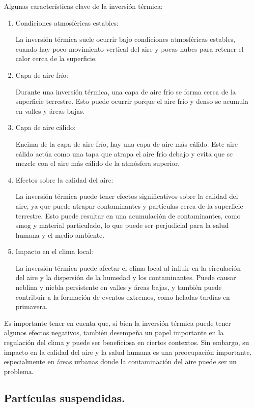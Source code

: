 \documentclass[12pt]{article}
\begin{document}
Algunas características clave de la inversión térmica:
\begin{enumerate}
\item Condiciones atmosféricas estables:

La inversión térmica suele ocurrir bajo condiciones atmosféricas estables, cuando hay poco movimiento vertical del aire y pocas nubes para retener el calor cerca de la superficie.
\item Capa de aire frío:

Durante una inversión térmica, una capa de aire frío se forma cerca de la superficie terrestre. Esto puede ocurrir porque el aire frío y denso se acumula en valles y áreas bajas.
\item Capa de aire cálido:

Encima de la capa de aire frío, hay una capa de aire más cálido. Este aire cálido actúa como una tapa que atrapa el aire frío debajo y evita que se mezcle con el aire más cálido de la atmósfera superior.
\item Efectos sobre la calidad del aire:

La inversión térmica puede tener efectos significativos sobre la calidad del aire, ya que puede atrapar contaminantes y partículas cerca de la superficie terrestre. Esto puede resultar en una acumulación de contaminantes, como smog y material particulado, lo que puede ser perjudicial para la salud humana y el medio ambiente.
\item Impacto en el clima local:

La inversión térmica puede afectar el clima local al influir en la circulación del aire y la dispersión de la humedad y los contaminantes. Puede causar neblina y niebla persistente en valles y áreas bajas, y también puede contribuir a la formación de eventos extremos, como heladas tardías en primavera.
\end{enumerate}

Es importante tener en cuenta que, si bien la inversión térmica puede tener algunos efectos negativos, también desempeña un papel importante en la regulación del clima y puede ser beneficiosa en ciertos contextos. Sin embargo, su impacto en la calidad del aire y la salud humana es una preocupación importante, especialmente en áreas urbanas donde la contaminación del aire puede ser un problema.

\subsection{Partículas suspendidas.}
\end{document}
